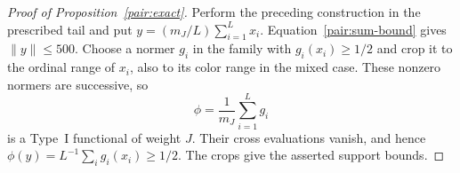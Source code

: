 \begin{proof}[Proof of Proposition~\ref{pair:exact}]
Perform the preceding construction in the prescribed tail and put
$y=(m_J/L)\sum_{i=1}^Lx_i$.  Equation~\eqref{pair:sum-bound} gives
$\|y\|\le500$.  Choose a normer $g_i$ in the family with
$g_i(x_i)\ge1/2$ and crop it to the ordinal range of $x_i$, also to its
color range in the mixed case.  These nonzero normers are successive, so
\[
 \phi=\frac1{m_J}\sum_{i=1}^Lg_i
\]
is a Type~I functional of weight $J$.  Their cross evaluations vanish,
and hence $\phi(y)=L^{-1}\sum_i g_i(x_i)\ge1/2$.
The crops give the asserted support bounds.
\end{proof}

